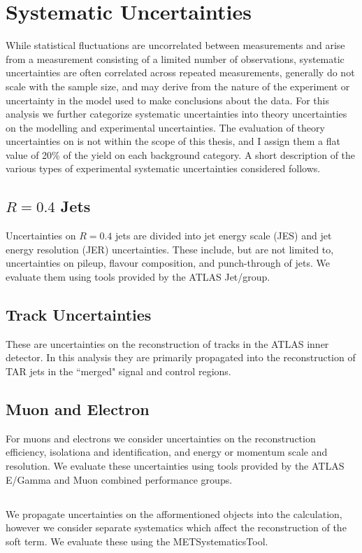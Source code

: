 \section{Systematic Uncertainties}
While statistical fluctuations are uncorrelated between measurements and arise from a measurement consisting of a limited number of observations, systematic uncertainties are often correlated across repeated measurements, generally do not scale with the sample size, and may derive from the nature of the experiment or uncertainty in the model used to make conclusions about the data.  For this analysis we further categorize systematic uncertainties into theory uncertainties on the modelling and experimental uncertainties. The evaluation of theory uncertainties on is not within the scope of this thesis, and I assign them a flat value of 20\% of the yield on each background category. A short description of the various types of experimental systematic uncertainties considered follows.

\subsection{$R=0.4$ Jets}
Uncertainties on $R=0.4$ jets are divided into jet energy scale (JES) and jet energy resolution (JER) uncertainties. These include, but are not limited to, uncertainties on pileup, flavour composition, and punch-through of jets. We evaluate them using tools provided by the ATLAS Jet/\met group.

\subsection{Track Uncertainties}
These are uncertainties on the reconstruction of tracks in the ATLAS inner detector. In this analysis they are primarily propagated into the reconstruction of TAR jets in the ``merged" signal and control regions.

\subsection{Muon and Electron}
For muons and electrons we consider uncertainties on the reconstruction efficiency, isolationa and identification, and energy or momentum scale and resolution. We evaluate these uncertainties using tools provided by the ATLAS E/Gamma and Muon combined performance groups.

\subsection{\met}
We propagate uncertainties on the afformentioned objects into the \met calculation, however we consider separate \met systematics which affect the reconstruction of the \met soft term. We evaluate these using the METSystematicsTool.

